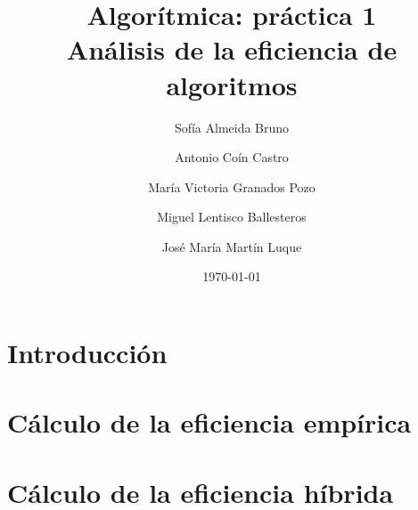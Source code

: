\documentclass[11pt]{article}
\title{Algorítmica: práctica 1 \\ \large Análisis de la eficiencia de algoritmos}
\author{Sofía Almeida Bruno \and Antonio Coín Castro \and María Victoria Granados Pozo \and Miguel Lentisco Ballesteros \and José María Martín Luque}
\date{\today}
\begin{document}
\maketitle

\newpage

\section*{Introducción}

\section*{Cálculo de la eficiencia empírica}

\begin{center}
	
\end{center}
	

\section*{Cálculo de la eficiencia híbrida}
\end{document}
